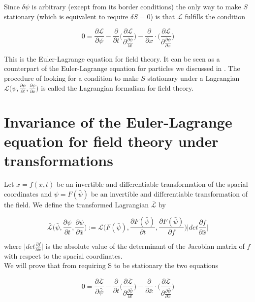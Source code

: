\documentclass{article}
\begin{document}
Since $\delta \psi$ is arbitrary (except from its border conditions) the only way to make $S$ stationary (which is equivalent to require $\delta S = 0$) is that $\mathcal{L}$ fulfills the condition


\begin{equation}
0 = \frac{\partial \mathcal{L}}{\partial \psi}
-\frac{\partial}{\partial t} \bigg( \frac{\partial \mathcal{L}}{\partial \frac{\partial \psi}{\partial t}} \bigg) 
-\frac{\partial}{\partial x} \cdot \bigg( \frac{\partial \mathcal{L}}{\partial \frac{\partial \psi}{\partial x}} \bigg) 
\end{equation}

This is the Euler-Lagrange equation for field theory. It can be seen as a counterpart of the Euler-Lagrange equation for particles we discussed in \cite{WagnerGuthrie}. The procedure of looking for a condition to make $S$ stationary under a Lagrangian $\mathcal{L}\bigg(\psi, \frac{\partial \psi}{\partial t}, \frac{\partial \psi}{\partial x}\bigg)$ is called the Lagrangian formalism for field theory.

\section{Invariance of the Euler-Lagrange equation for field theory under transformations}

Let $x=f(\bar{x},t)$ be an invertible and differentiable transformation of the spacial coordinates and $\psi=F(\bar{\psi})$ be an invertible and differentiable transformation of the field. We define the transformed Lagrangian  $\bar{\mathcal{L}}$ by

\begin{equation} \label{LagrTransform}
\bar{\mathcal{L}}\bigg(\bar{\psi}, \frac{\partial \bar{\psi}}{\partial t}, \frac{\partial \bar{\psi}}{\partial \bar{x}}\bigg) 
:= \mathcal{L}\bigg(F(\bar{\psi}), \frac{\partial F(\bar{\psi})}{\partial t}, \frac{\partial F(\bar{\psi})}{\partial f}\bigg) 
\bigg| det \frac{\partial f}{\partial \bar{x}} \bigg|
\end{equation}

where $\bigg| det \frac{\partial f}{\partial \bar{x}} \bigg|$ is the absolute value of the determinant of the Jacobian matrix of $f$ with respect to the spacial coordinates. \\

We will prove that from requiring S to be stationary the two equations

\begin{equation} \label{ELGTransformed}
0 = \frac{\partial \bar{\mathcal{L}}}{\partial \bar{\psi}}
-\frac{\partial}{\partial t} \bigg( \frac{\partial \mathcal{\bar{L}}}{\partial \frac{\partial \bar{\psi}}{\partial t}} \bigg) 
-\frac{\partial}{\partial \bar{x}} \cdot \bigg( \frac{\partial \mathcal{\bar{L}}}{\partial \frac{\partial \bar{\psi}}{\partial \bar{x}}} \bigg) 
\end{equation}
\end{document}
